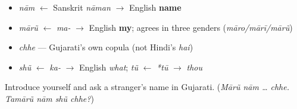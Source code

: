 \begin{grammarlens}[title={What you've built — roots you now carry}]
\begin{itemize}
\raggedright
  \item \emph{nām} $\leftarrow$ Sanskrit \emph{nāman} $\to$ English \textbf{name}
  \item \emph{mārũ} $\leftarrow$ \emph{ma-} $\to$ English \textbf{my}; agrees in three genders (\emph{māro/mārī/mārũ})
  \item \emph{chhe} — Gujarati's own copula (not Hindi's \emph{hai})
  \item \emph{shũ} $\leftarrow$ \emph{ka-} $\to$ English \emph{what}; \emph{tũ} $\leftarrow$ \emph{*tū} $\to$ \emph{thou}
\end{itemize}
\end{grammarlens}

\begin{tcolorbox}[breakable,colback=teal!4,colframe=teal!35!black,title={Before you move on}]
Introduce yourself and ask a stranger's name in Gujarati. (\emph{Mārũ nām … chhe. Tamārũ nām shũ chhe?})
\end{tcolorbox}
